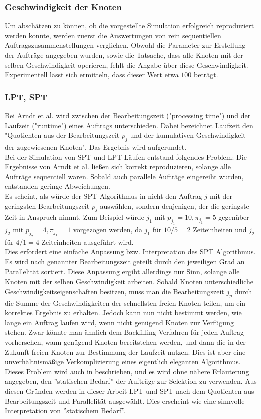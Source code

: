 \subsubsection{Geschwindigkeit der Knoten}
Um abschätzen zu können, ob die vorgestellte Simulation erfolgreich reproduziert werden konnte, werden zuerst die Auswertungen von rein sequentiellen Auftragszusammenstellungen verglichen. Obwohl die Parameter zur Erstellung der Aufträge angegeben wurden, sowie die Tatsache, dass alle Knoten mit der selben Geschwindigkeit operieren, fehlt die Angabe über diese Geschwindigkeit. Experimentell lässt sich ermitteln, dass dieser Wert etwa $100$ beträgt.

\subsubsection{LPT, SPT}
\label{spt-lpt-time}
Bei Arndt et al. \cite[p.~4]{Arn99} wird zwischen der Bearbeitungszeit ("processing time") und der Laufzeit ("runtime") eines Auftrags unterschieden. Dabei bezeichnet Laufzeit den "Quotienten aus der Bearbeitungszeit $p_j$ und der kumulativen Geschwindigkeit der zugewiesenen Knoten". Das Ergebnis wird aufgerundet.\\
Bei der Simulation von SPT und LPT Läufen entstand folgendes Problem: Die Ergebnisse von Arndt et al. \cite{Arn99} ließen sich korrekt reproduzieren, solange alle Aufträge sequentiell waren. Sobald auch parallele Aufträge eingereiht wurden, entstanden geringe Abweichungen.\\
Es scheint, als würde der SPT Algorithmus in \cite{Arn99} nicht den Auftrag $j$ mit der geringsten Bearbeitungszeit $p_j$ auswählen, sondern denjenigen, der die geringste Zeit in Anspruch nimmt. Zum Beispiel würde $j_1$ mit $p_{j_1} = 10, \pi_{j_1} = 5$ gegenüber $j_2$ mit $p_{j_2} = 4, \pi_{j_1} = 1$ vorgezogen werden, da $j_1$ für $10/5 = 2$  Zeiteinheiten und $j_2$ für $4/1 = 4$ Zeiteinheiten ausgeführt wird.\\
Dies erfordert eine einfache Anpassung bzw. Interpretation des SPT Algorithmus. Es wird nach genannter Bearbeitungszeit geteilt durch den jeweiligen Grad an Parallelität sortiert. Diese Anpassung ergibt allerdings nur Sinn, solange alle Knoten mit der selben Geschwindigkeit arbeiten. Sobald Knoten unterschiedliche Geschwindigkeitseigenschaften besitzen, muss man die Bearbeitungszeit $j_p$ durch die Summe der Geschwindigkeiten der schnellsten freien Knoten teilen, um ein korrektes Ergebnis zu erhalten. Jedoch kann nun nicht bestimmt werden, wie lange ein Auftrag laufen wird, wenn nicht genügend Knoten zur Verfügung stehen. Zwar könnte man ähnlich dem Backfilling-Verfahren für jeden Auftrag vorhersehen, wann genügend Knoten bereitstehen werden, und dann die in der Zukunft freien Knoten zur Bestimmung der Laufzeit nutzen. Dies ist aber eine unverhältnismäßige Verkomplizierung eines eigentlich eleganten Algorithmus.\\
Dieses Problem wird auch in \cite{Arn99} beschrieben, und es wird ohne nähere Erläuterung angegeben, den ''statischen Bedarf'' der Aufträge zur Selektion zu verwenden. Aus diesen Gründen werden in dieser Arbeit LPT und SPT nach dem Quotienten aus Bearbeitungszeit und Parallelität ausgewählt. Dies erscheint wie eine sinnvolle Interpretation von ''statischem Bedarf''.
